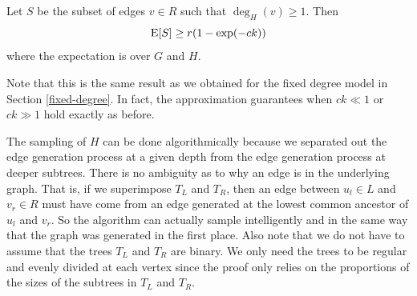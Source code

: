 \begin{thm}
Let $S$ be the subset of edges $v\in R$ such that $\deg_H(v) \geq 1$. Then
\[ \text{E}[S] \geq r(1-\exp(-ck)) \]
where the expectation is over $G$ and $H$.
\end{thm}

%
%

Note that this is the same result as we obtained for the fixed degree
model in Section \ref{fixed-degree}. In fact, the approximation
guarantees when $ck \ll 1$ or $ck \gg 1$ hold exactly as before.\vs

The sampling of $H$ can be done algorithmically because we separated
out the edge generation process at a given depth from the edge
generation process at deeper subtrees. There is no ambiguity as to why
an edge is in the underlying graph. That is, if we superimpose $T_L$
and $T_R$, then an edge between $u_l\in L$ and $v_r\in R$ must have
come from an edge generated at the lowest common ancestor of $u_l$ and
$v_r$. So the algorithm can actually sample intelligently and in the
same way that the graph was generated in the first place. Also note
that we do not have to assume that the trees $T_L$ and $T_R$ are
binary. We only need the trees to be regular and evenly divided at
each vertex since the proof only relies on the proportions of the
sizes of the subtrees in $T_L$ and $T_R$.


